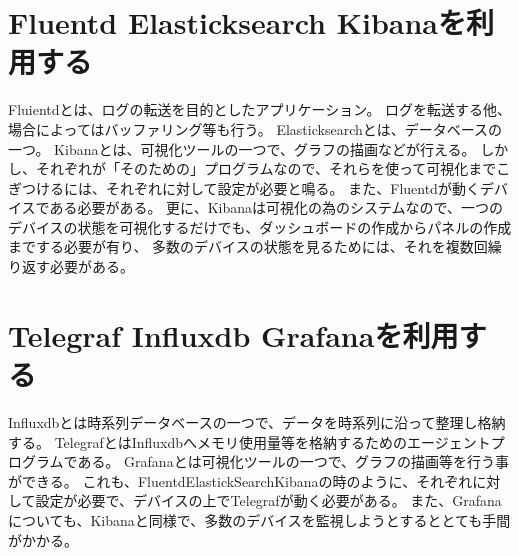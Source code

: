 \section{Fluentd Elasticksearch Kibanaを利用する}
Fluientdとは、ログの転送を目的としたアプリケーション。
ログを転送する他、場合によってはバッファリング等も行う。
Elasticksearchとは、データベースの一つ。
Kibanaとは、可視化ツールの一つで、グラフの描画などが行える。
しかし、それぞれが「そのための」プログラムなので、それらを使って可視化までこぎつけるには、それぞれに対して設定が必要と鳴る。
また、Fluentdが動くデバイスである必要がある。
更に、Kibanaは可視化の為のシステムなので、一つのデバイスの状態を可視化するだけでも、ダッシュボードの作成からパネルの作成までする必要が有り、
多数のデバイスの状態を見るためには、それを複数回繰り返す必要がある。

\section{Telegraf Influxdb Grafanaを利用する}
Influxdbとは時系列データベースの一つで、データを時系列に沿って整理し格納する。
TelegrafとはInfluxdbへメモリ使用量等を格納するためのエージェントプログラムである。
Grafanaとは可視化ツールの一つで、グラフの描画等を行う事ができる。
これも、FluentdElastickSearchKibanaの時のように、それぞれに対して設定が必要で、デバイスの上でTelegrafが動く必要がある。
また、Grafanaについても、Kibanaと同様で、多数のデバイスを監視しようとするととても手間がかかる。



